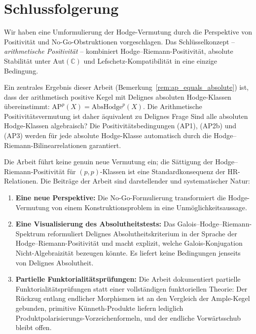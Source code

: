 \documentclass[aps,prd,twocolumn,superscriptaddress,nofootinbib]{revtex4-2}
\theoremstyle{definition}
\theoremstyle{remark}
\begin{document}
\section{Schlussfolgerung}
\label{sec:conclusion}

Wir haben eine Umformulierung der Hodge-Vermutung durch die Perspektive von Positivität und No-Go-Obstruktionen vorgeschlagen. Das Schlüsselkonzept -- \textit{arithmetische Positivität} -- kombiniert Hodge--Riemann-Positivität, absolute Stabilität unter $\mathrm{Aut}(\mathbb{C})$ und Lefschetz-Kompatibilität in eine einzige Bedingung.

Ein zentrales Ergebnis dieser Arbeit (Bemerkung~\ref{rem:ap_equals_absolute}) ist, dass der arithmetisch positive Kegel mit Delignes absoluten Hodge-Klassen übereinstimmt: $\mathrm{AP}^p(X) = \mathrm{AbsHodge}^p(X)$. Die Arithmetische Positivitätsvermutung ist daher äquivalent zu Delignes Frage \glqq Sind alle absoluten Hodge-Klassen algebraisch?\grqq{} Die Positivitätsbedingungen (AP1), (AP2b) und (AP3) werden für jede absolute Hodge-Klasse automatisch durch die Hodge--Riemann-Bilinearrelationen garantiert.

Die Arbeit führt keine genuin neue Vermutung ein; die Sättigung der Hodge--Riemann-Positivität für $(p,p)$-Klassen ist eine Standardkonsequenz der HR-Relationen. Die Beiträge der Arbeit sind darstellender und systematischer Natur:

\begin{enumerate}
\item \textbf{Eine neue Perspektive:} Die No-Go-Formulierung transformiert die Hodge-Vermutung von einem Konstruktionsproblem in eine Unmöglichkeitsaussage.

\item \textbf{Eine Visualisierung des Absolutheitstests:} Das Galois--Hodge--Riemann-Spektrum reformuliert Delignes Absolutheitskriterium in der Sprache der Hodge--Riemann-Positivität und macht explizit, welche Galois-Konjugation Nicht-Algebraizität bezeugen könnte. Es liefert keine Bedingungen jenseits von Delignes Absolutheit.

\item \textbf{Partielle Funktorialitätsprüfungen:} Die Arbeit dokumentiert partielle Funktorialitätsprüfungen statt einer vollständigen funktoriellen Theorie: Der Rückzug entlang endlicher Morphismen ist an den Vergleich der Ample-Kegel gebunden, primitive Künneth-Produkte liefern lediglich Produktpolarisierungs-Vorzeichenformeln, und der endliche Vorwärtsschub bleibt offen.
\end{enumerate}
\end{document}
